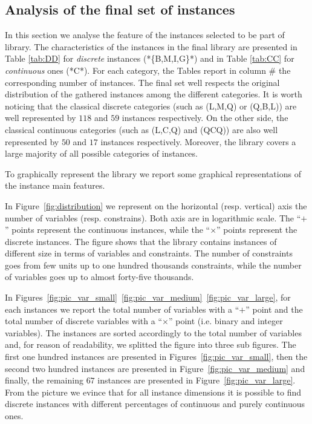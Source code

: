 \subsection{Analysis of the final set of instances}\label{subsec:final set}

In this section we analyse the feature of the instances selected to be
part of library.
The characteristics of the instances in the final library are
presented in Table \ref{tab:DD} for \emph{discrete} instances
(*\{B,M,I,G\}*) and in Table \ref{tab:CC} for
\emph{continuous} ones (*C*).
For each category, the Tables report in column $\#$ the corresponding
number of instances.
The final set well respects the original distribution of the gathered
instances among the different categories.
It is worth noticing that the classical discrete categories (such as
(L,M,Q) or (Q,B,L)) are well represented by $118$ and $59$  instances
respectively. On the other side, the classical continuous categories
(such as (L,C,Q) and (QCQ)) are also well represented by $50$ and $17$
 instances respectively.
Moreover, the library covers a large majority of all possible
categories of instances.

To graphically represent the library we report some
graphical representations of the instance main features.

In Figure~\ref{fig:distribution} we represent 
on the horizontal (resp. vertical) axis the number of variables (resp.
constrains). Both axis are in logarithmic scale.
The ``$+$'' points represent  the continuous instances, while the 
``$\times$'' points represent the discrete instances. The figure shows that
the library contains instances of different size in terms of variables
and constraints. The number of constraints goes from few units up to
one hundred thousands constraints, while the number of variables goes
up to almost forty-five thousands.

In Figures~\ref{fig:pic_var_small}~\ref{fig:pic_var_medium}~\ref{fig:pic_var_large},
for each instances we report the total number of variables with a
``$+$'' point and  the total number of discrete variables with a
``$\times$'' point (i.e. binary and integer variables). The instances are
sorted accordingly to the total number of variables and, for reason of
readability, we splitted the figure into three sub figures. The first one hundred
instances are presented in Figures~\ref{fig:pic_var_small},
then the second two hundred instances are presented in
Figure~\ref{fig:pic_var_medium} and finally, the remaining $67$
instances are presented in Figure~\ref{fig:pic_var_large}.
From the picture we evince that for all instance dimensions it is
possible to find discrete instances with different percentages of
continuous and purely continuous ones.




